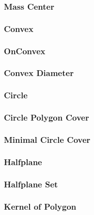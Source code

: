 \documentclass[10pt,twocolumn,oneside]{article}
\begin{document}
    \subsubsection{Mass Center}
    
    \subsubsection{Convex}
    
    \subsubsection{OnConvex}
    
    \subsubsection{Convex Diameter}
    
    \subsubsection{Circle}
    
    \subsubsection{Circle Polygon Cover}
    
    \subsubsection{Minimal Circle Cover}
    
    \subsubsection{Halfplane}
    
    \subsubsection{Halfplane Set}
    
    \subsubsection{Kernel of Polygon}
    
    \newpage
\end{document}

